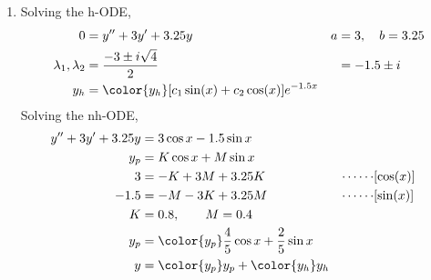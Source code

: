 \begin{enumerate}
    \item Solving the h-ODE,
          \begin{align}
              0                        & = y'' + 3y' + 3.25y          &
              a                        & = 3, \quad b = 3.25            \\
              \lambda_{1}, \lambda_{2} & = \frac{-3 \pm i\sqrt{4}}{2} &
                                       & = -1.5 \pm i                   \\
              y_{h}                    & = \color{y_h} [c_{1}\sin(x)
                  + c_{2}\cos(x)]e^{-1.5x}
          \end{align}
          Solving the nh-ODE,
          \begin{align}
              y'' + 3y' + 3.25y & = 3\cos x - 1.5\sin x                         \\
              y_{p}             & = K \cos x + M \sin x                         \\
              3                 & = -K + 3M + 3.25K                           &
              \cdots\cdots      & [\cos(x)]                                     \\
              -1.5              & = -M - 3K + 3.25M                           &
              \cdots\cdots      & [\sin(x)]                                     \\
              K                 & = 0.8, \qquad M = 0.4                         \\
              y_{p}             & = \color{y_p} \frac{4}{5}\cos x
              + \frac{2}{5}\sin x                                               \\
              y                 & = {\color{y_p} y_{p}} + {\color{y_h} y_{h}}
          \end{align}


\end{enumerate}

